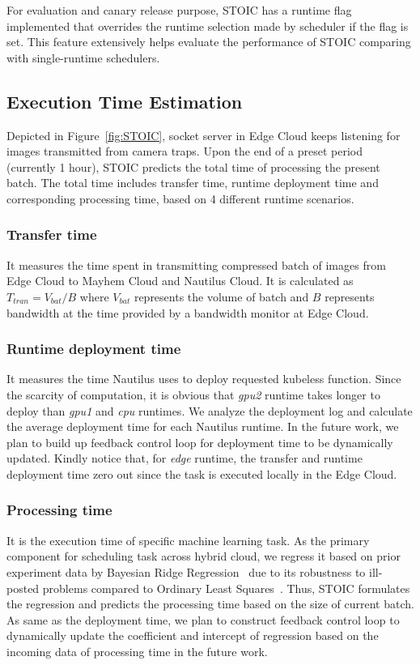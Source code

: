  For evaluation and canary release purpose, STOIC has a runtime flag implemented that overrides the runtime selection made by scheduler if the flag is set. This feature extensively helps evaluate the performance of STOIC comparing with single-runtime schedulers.
 
 
 \subsection{Execution Time Estimation}
 Depicted in Figure~\ref{fig:STOIC}, socket server in Edge Cloud keeps listening for images transmitted from camera traps. Upon the end of a preset period (currently 1 hour), STOIC predicts the total time of processing the present batch. The total time includes transfer time, runtime deployment time and corresponding processing time, based on 4 different runtime scenarios. 
 
 \subsubsection{Transfer time} It measures the time spent in transmitting compressed batch of images from Edge Cloud to Mayhem Cloud and Nautilus Cloud. It is calculated as ${T_{tran} = V_{bat} / B}$ where $V_{bat}$ represents the volume of batch and $B$ represents bandwidth at the time provided by a bandwidth monitor at Edge Cloud. 
 
 \subsubsection{Runtime deployment time} It measures the time Nautilus uses to deploy requested kubeless function. Since the scarcity of computation, it is obvious that \textit{gpu2} runtime takes longer to deploy than \textit{gpu1} and \textit{cpu} runtimes. We analyze the deployment log and calculate the average deployment time for each Nautilus runtime. In the future work, we plan to build up feedback control loop for deployment time to be dynamically updated. Kindly notice that, for \textit{edge} runtime, the transfer and runtime deployment time zero out since the task is executed locally in the Edge Cloud.
 
 \subsubsection{Processing time} It is the execution time of specific machine learning task. As the primary component for scheduling task across hybrid cloud, we regress it based on prior experiment data by Bayesian Ridge Regression~\cite{ref:brr} due to its robustness to ill-posted problems compared to Ordinary Least Squares~\cite{ref:ols}. Thus, STOIC formulates the regression and predicts the processing time based on the size of current batch. As same as the deployment time, we plan to construct feedback control loop to dynamically update the coefficient and intercept of regression based on the incoming data of processing time in the future work.
 

